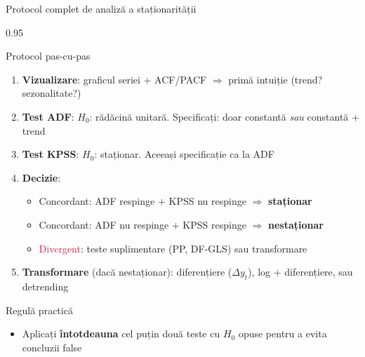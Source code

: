 \documentclass[9pt, aspectratio=169, t]{beamer}
\begin{document}
\begin{frame}{Protocol complet de analiză a staționarității}
    \begin{cminipage}{0.95\textwidth}
        \vspace{-0.2cm}
        {\footnotesize
        \begin{block}{Protocol pas-cu-pas}
            \begin{enumerate}\setlength{\itemsep}{2pt}
                \item[\textcolor{MainBlue}{\textbf{1.}}] \textbf{Vizualizare}: graficul seriei $+$ ACF/PACF $\Rightarrow$ primă intuiție (trend? sezonalitate?)
                \item[\textcolor{MainBlue}{\textbf{2.}}] \textbf{Test ADF}: $H_0$: rădăcină unitară. Specificați: doar constantă \textit{sau} constantă $+$ trend
                \item[\textcolor{MainBlue}{\textbf{3.}}] \textbf{Test KPSS}: $H_0$: staționar. Aceeași specificație ca la ADF
                \item[\textcolor{MainBlue}{\textbf{4.}}] \textbf{Decizie}:
                    \begin{itemize}\setlength{\itemsep}{0pt}
                        \item \textcolor{Forest}{Concordant}: ADF respinge $+$ KPSS nu respinge $\Rightarrow$ \textbf{staționar}
                        \item \textcolor{Forest}{Concordant}: ADF nu respinge $+$ KPSS respinge $\Rightarrow$ \textbf{nestaționar}
                        \item \textcolor{Crimson}{Divergent}: teste suplimentare (PP, DF-GLS) sau transformare
                    \end{itemize}
                \item[\textcolor{MainBlue}{\textbf{5.}}] \textbf{Transformare} (dacă nestaționar): diferențiere ($\Delta y_t$), log $+$ diferențiere, sau detrending
            \end{enumerate}
        \end{block}
        \vspace{0.1cm}
        \begin{alertblock}{Regulă practică}
            \begin{itemize}\setlength{\itemsep}{0pt}
                \item Aplicați \textbf{întotdeauna} cel puțin două teste cu $H_0$ opuse pentru a evita concluzii false
            \end{itemize}
        \end{alertblock}
        }
    \end{cminipage}
\end{frame}
\end{document}
